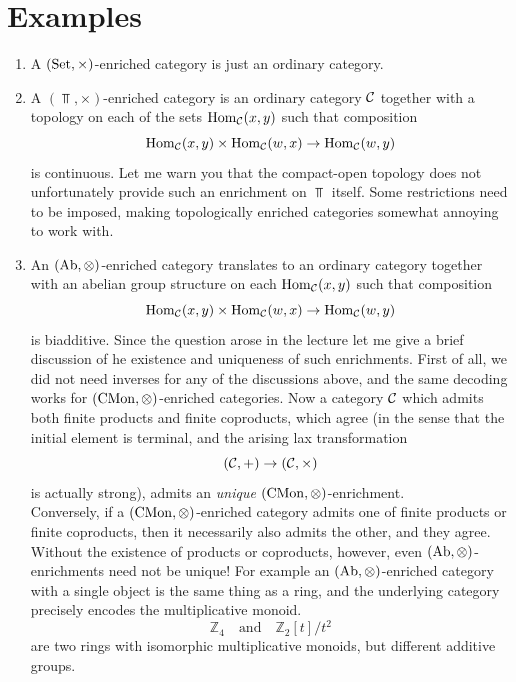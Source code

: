     \section{Examples}
        \begin{enumerate}[label=\roman*)]
            \item
                A $(\operatorname{Set}, \times)$-enriched category is just an ordinary category.
            \item
                A $(\Top, \times)$-enriched category is an ordinary category $\mathcal{C}$ together with a topology on each of the sets $\operatorname{Hom}_{\mathcal{C}}(x, y)$ such that composition
                \begin{equation*}
                    \operatorname{Hom}_{\mathcal{C}}(x, y) \times \operatorname{Hom}_{\mathcal{C}}(w, x) \to \operatorname{Hom}_{\mathcal{C}}(w, y)
                \end{equation*}
                is continuous. Let me warn you that the compact-open topology does not unfortunately provide such an enrichment on $\Top$ itself. Some restrictions need to be imposed, making topologically enriched categories somewhat annoying to work with.
            \item 
                An $(\operatorname{Ab}, \otimes)$-enriched category translates to an ordinary category together with an abelian group structure on each $\operatorname{Hom}_{\mathcal{C}}(x, y)$ such that composition
                \begin{equation*}
                    \operatorname{Hom}_{\mathcal{C}}(x, y) \times \operatorname{Hom}_{\mathcal{C}}(w, x) \to \operatorname{Hom}_{\mathcal{C}}(w, y)
                \end{equation*}
                is biadditive. Since the question arose in the lecture let me give a brief discussion of he existence and uniqueness of such enrichments. First of all, we did not need inverses for any of the discussions above, and the same decoding works for $(\operatorname{CMon}, \otimes)$-enriched categories. Now a category $\mathcal{C}$ which admits both finite products and finite coproducts, which agree (in the sense that the initial element is terminal, and the arising lax transformation
                \begin{equation*}
                    (\mathcal{C}, +) \to (\mathcal{C}, \times)
                \end{equation*}
                is actually strong), admits an \emph{unique} $(\operatorname{CMon}, \otimes)$-enrichment. \\ 
                Conversely, if a $(\operatorname{CMon}, \otimes)$-enriched category admits one of finite products or finite coproducts, then it necessarily also admits the other, and they agree. Without the existence of products or coproducts, however, even $(\operatorname{Ab}, \otimes)$-enrichments need not be unique! For example an $(\operatorname{Ab}, \otimes)$-enriched category with a single object is the same thing as a ring, and the underlying category precisely encodes the multiplicative monoid.
                \begin{equation*}
                    \mathbb{Z}_4 \quad \text{and} \quad \mathbb{Z}_2[t]/{t^2} 
                \end{equation*}
                are two rings with isomorphic multiplicative monoids, but different additive groups.
        \end{enumerate}

